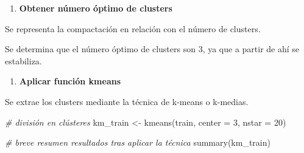 \documentclass[
]{article}
\newenvironment{Shaded}{\begin{snugshade}}{\end{snugshade}}
\newcommand{\AttributeTok}[1]{\textcolor[rgb]{0.77,0.63,0.00}{#1}}
\newcommand{\CommentTok}[1]{\textcolor[rgb]{0.56,0.35,0.01}{\textit{#1}}}
\newcommand{\ControlFlowTok}[1]{\textcolor[rgb]{0.13,0.29,0.53}{\textbf{#1}}}
\newcommand{\DecValTok}[1]{\textcolor[rgb]{0.00,0.00,0.81}{#1}}
\newcommand{\FunctionTok}[1]{\textcolor[rgb]{0.00,0.00,0.00}{#1}}
\newcommand{\NormalTok}[1]{#1}
\newcommand{\OtherTok}[1]{\textcolor[rgb]{0.56,0.35,0.01}{#1}}
\newcommand{\SpecialCharTok}[1]{\textcolor[rgb]{0.00,0.00,0.00}{#1}}
\newcommand{\StringTok}[1]{\textcolor[rgb]{0.31,0.60,0.02}{#1}}
\providecommand{\tightlist}{%
  \setlength{\itemsep}{0pt}\setlength{\parskip}{0pt}}
\begin{document}
\begin{enumerate}
\def\labelenumi{\arabic{enumi}.}
\tightlist
\item
  \textbf{Obtener número óptimo de clusters}
\end{enumerate}

Se representa la compactación en relación con el número de clusters.

\begin{Shaded}
\end{Shaded}

Se determina que el número óptimo de clusters son 3, ya que a partir de
ahí se estabiliza.

\begin{enumerate}
\def\labelenumi{\arabic{enumi}.}
\setcounter{enumi}{1}
\tightlist
\item
  \textbf{Aplicar función kmeans}
\end{enumerate}

Se extrae los clusters mediante la técnica de k-means o k-medias.

\begin{Shaded}
\begin{Highlighting}[]
\CommentTok{\# división en clústeres}
\NormalTok{km\_train }\OtherTok{\textless{}{-}} \FunctionTok{kmeans}\NormalTok{(train, }\AttributeTok{center =} \DecValTok{3}\NormalTok{, }\AttributeTok{nstar =} \DecValTok{20}\NormalTok{)}

\CommentTok{\# breve resumen resultados tras aplicar la técnica}
\FunctionTok{summary}\NormalTok{(km\_train)}
\end{Highlighting}
\end{Shaded}
\end{document}
